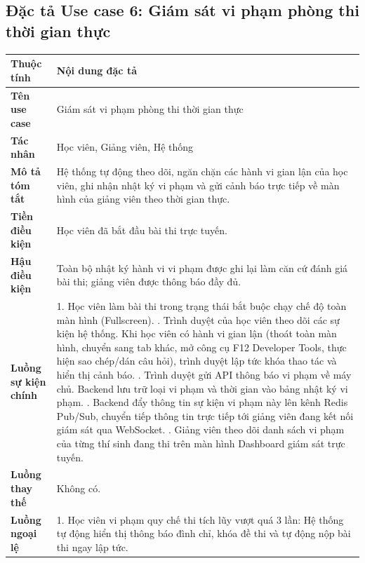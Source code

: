 \documentclass[../DoAn.tex]{subfiles}
\begin{document}
\subsection{Đặc tả Use case 6: Giám sát vi phạm phòng thi thời gian thực}
\nopagebreak
\begingroup
\centering
\fontsize{11pt}{14pt}\selectfont
\begin{tabular}{|p{3.2cm}|p{10.8cm}|}
\hline
\textbf{Thuộc tính} & \textbf{Nội dung đặc tả} \\ \hline
\textbf{Tên use case} & Giám sát vi phạm phòng thi thời gian thực \\ \hline
\textbf{Tác nhân} & Học viên, Giảng viên, Hệ thống \\ \hline
\textbf{Mô tả tóm tắt} & Hệ thống tự động theo dõi, ngăn chặn các hành vi gian lận của học viên, ghi nhận nhật ký vi phạm và gửi cảnh báo trực tiếp về màn hình của giảng viên theo thời gian thực. \\ \hline
\textbf{Tiền điều kiện} & Học viên đã bắt đầu bài thi trực tuyến. \\ \hline
\textbf{Hậu điều kiện} & Toàn bộ nhật ký hành vi vi phạm được ghi lại làm căn cứ đánh giá bài thi; giảng viên được thông báo đầy đủ. \\ \hline
\textbf{Luồng sự kiện chính} & 
1. Học viên làm bài thi trong trạng thái bắt buộc chạy chế độ toàn màn hình (Fullscreen). \newline
2. Trình duyệt của học viên theo dõi các sự kiện hệ thống. Khi học viên có hành vi gian lận (thoát toàn màn hình, chuyển sang tab khác, mở công cụ F12 Developer Tools, thực hiện sao chép/dán câu hỏi), trình duyệt lập tức khóa thao tác và hiển thị cảnh báo. \newline
3. Trình duyệt gửi API thông báo vi phạm về máy chủ. Backend lưu trữ loại vi phạm và thời gian vào bảng nhật ký vi phạm. \newline
4. Backend đẩy thông tin sự kiện vi phạm này lên kênh Redis Pub/Sub, chuyển tiếp thông tin trực tiếp tới giảng viên đang kết nối giám sát qua WebSocket. \newline
5. Giảng viên theo dõi danh sách vi phạm của từng thí sinh đang thi trên màn hình Dashboard giám sát trực tuyến. \\ \hline
\textbf{Luồng thay thế} & Không có. \\ \hline
\textbf{Luồng ngoại lệ} & 
1. Học viên vi phạm quy chế thi tích lũy vượt quá 3 lần: Hệ thống tự động hiển thị thông báo đình chỉ, khóa đề thi và tự động nộp bài thi ngay lập tức. \\ \hline
\end{tabular}
\label{table:uc_monitor_exam_violations}
\par
\endgroup
\end{document}
